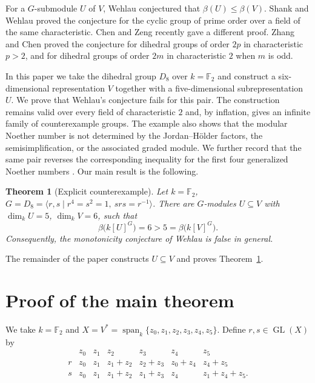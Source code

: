 \documentclass[11pt]{article}
\newtheorem{theorem}{Theorem}[section]
\theoremstyle{definition}
\newcommand{\F}{\mathbb F}
\newcommand{\GL}{\operatorname{GL}}
\newcommand{\Span}{\operatorname{span}}
\begin{document}
	For a $G$-submodule $U$ of $V$, Wehlau \cite{OP} conjectured that $\beta(U)\leq\beta(V)$. Shank and Wehlau \cite{ShWe} proved the conjecture for the cyclic group of prime order over a field of the same characteristic. Chen and Zeng \cite{NP} recently gave a different proof. Zhang and Chen \cite{DG} proved the conjecture for dihedral groups of order $2p$ in characteristic $p>2$, and for dihedral groups of order $2m$ in characteristic $2$ when $m$ is odd.
	
	In this paper we take the dihedral group $D_8$ over $k=\mathbb{F}_2$ and construct a six-dimensional representation $V$ together with a five-dimensional subrepresentation $U$. We prove that Wehlau's conjecture fails for this pair. The construction remains valid over every field of characteristic $2$ and, by inflation, gives an infinite family of counterexample groups. The example also shows that the modular Noether number is not determined by the Jordan--H\"older factors, the semisimplification, or the associated graded module. We further record that the same pair reverses the corresponding inequality for the first four generalized Noether numbers \cite{CD}. Our main result is the following.
	
	\begin{theorem}[Explicit counterexample]\label{thm:main}
		Let $k=\F_2$, $G=D_8=\langle r,s\mid r^4=s^2=1,\ srs=r^{-1}\rangle$. There are $G$-modules $U\subseteq V$ with $ \dim_k U=5$, $\dim_k V=6$, such that
		\[
		\beta\bigl(k[U]^G\bigr)=6>5=
		\beta\bigl(k[V]^G\bigr).
		\]
		Consequently, the monotonicity conjecture of Wehlau is false in general.
	\end{theorem}
	
	The remainder of the paper constructs $U\subseteq V$ and proves
	Theorem~\ref{thm:main}.
	
	\section{Proof of the main theorem}
	
	We take $k=\F_2$ and $X=V^*=\Span_k\{z_0,z_1,z_2,z_3,z_4,z_5\}$. Define $r,s\in\GL(X)$ by
	\begin{equation}\label{eq:X-action-table}
		\begin{array}{c|cccccc}
			&z_0&z_1&z_2&z_3&z_4&z_5\\ \hline
			r&z_0&z_1&z_1+z_2&z_2+z_3&z_0+z_4&z_4+z_5\\[1mm]
			s&z_0&z_1&z_1+z_2&z_1+z_3&z_4&z_1+z_4+z_5.
		\end{array}
	\end{equation}
	
\end{document}
